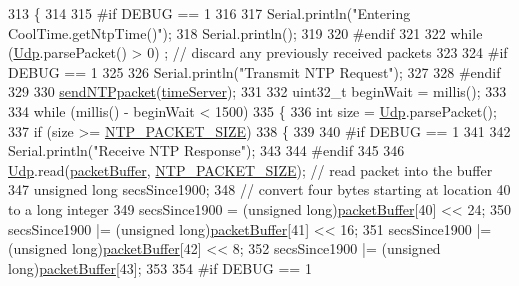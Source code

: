 \begin{DoxyCode}
313 \{
314 
315 \textcolor{preprocessor}{#if DEBUG == 1 }
316 
317     Serial.println(\textcolor{stringliteral}{"Entering CoolTime.getNtpTime()"});
318     Serial.println();
319 
320 \textcolor{preprocessor}{#endif }
321 
322     \textcolor{keywordflow}{while} (\hyperlink{classCoolTime_a4e23216a8121ca79d0fb019f30884b92}{Udp}.parsePacket() > 0) ; \textcolor{comment}{// discard any previously received packets}
323 
324 \textcolor{preprocessor}{#if DEBUG == 1 }
325     
326     Serial.println(\textcolor{stringliteral}{"Transmit NTP Request"});
327 
328 \textcolor{preprocessor}{#endif }
329 
330     \hyperlink{classCoolTime_a236a38d120dc53bc67456d763838c5a1}{sendNTPpacket}(\hyperlink{classCoolTime_ad2b9858f399108cb440dd1e908916f04}{timeServer});
331 
332     uint32\_t beginWait = millis();
333 
334     \textcolor{keywordflow}{while} (millis() - beginWait < 1500) 
335     \{
336         \textcolor{keywordtype}{int} size = \hyperlink{classCoolTime_a4e23216a8121ca79d0fb019f30884b92}{Udp}.parsePacket();
337         \textcolor{keywordflow}{if} (size >= \hyperlink{CoolTime_8h_a56a6ea64006651b4f42adf713e244f06}{NTP\_PACKET\_SIZE}) 
338         \{
339         
340 \textcolor{preprocessor}{        #if DEBUG == 1}
341 
342             Serial.println(\textcolor{stringliteral}{"Receive NTP Response"});
343         
344 \textcolor{preprocessor}{        #endif}
345 
346             \hyperlink{classCoolTime_a4e23216a8121ca79d0fb019f30884b92}{Udp}.read(\hyperlink{classCoolTime_a27e6abc82a5c2f72161956967005bec7}{packetBuffer}, \hyperlink{CoolTime_8h_a56a6ea64006651b4f42adf713e244f06}{NTP\_PACKET\_SIZE});  \textcolor{comment}{// read packet into the
       buffer}
347             \textcolor{keywordtype}{unsigned} \textcolor{keywordtype}{long} secsSince1900;
348             \textcolor{comment}{// convert four bytes starting at location 40 to a long integer}
349             secsSince1900 =  (\textcolor{keywordtype}{unsigned} long)\hyperlink{classCoolTime_a27e6abc82a5c2f72161956967005bec7}{packetBuffer}[40] << 24;
350             secsSince1900 |= (\textcolor{keywordtype}{unsigned} long)\hyperlink{classCoolTime_a27e6abc82a5c2f72161956967005bec7}{packetBuffer}[41] << 16;
351             secsSince1900 |= (\textcolor{keywordtype}{unsigned} long)\hyperlink{classCoolTime_a27e6abc82a5c2f72161956967005bec7}{packetBuffer}[42] << 8;
352             secsSince1900 |= (\textcolor{keywordtype}{unsigned} long)\hyperlink{classCoolTime_a27e6abc82a5c2f72161956967005bec7}{packetBuffer}[43];
353         
354 \textcolor{preprocessor}{        #if DEBUG == 1 }

\end{DoxyCode}
